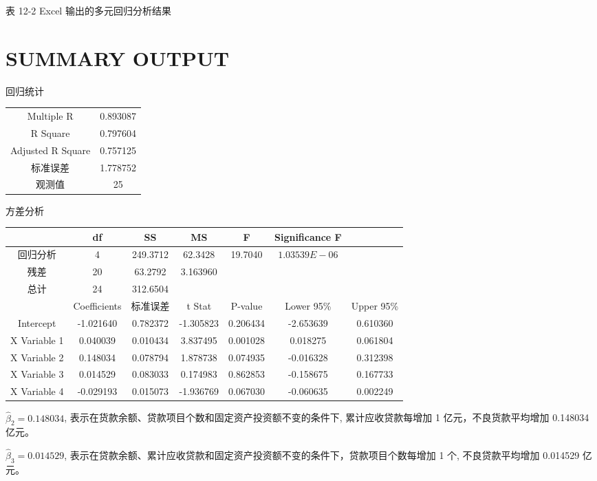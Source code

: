 \documentclass[10pt]{article}
\begin{document}
\begin{CJK*}{UTF8}{bsmi}
表 12-2 Excel 输出的多元回归分析结果

\section*{SUMMARY OUTPUT}
回归统计

\begin{center}
\begin{tabular}{cc}
\hline
Multiple R & 0.893087 \\
R Square & 0.797604 \\
Adjusted R Square & 0.757125 \\
标准误差 & 1.778752 \\
观测值 & 25 \\
\hline
\end{tabular}
\end{center}

方差分析

\begin{center}
\begin{tabular}{ccccccc}
\hline
 & df & SS & MS & F & Significance F &  \\
\hline
回归分析 & 4 & 249.3712 & 62.3428 & 19.7040 & $1.03539 E-06$ &  \\
残差 & 20 & 63.2792 & 3.163960 &  &  &  \\
总计 & 24 & 312.6504 &  &  &  &  \\
\hline
 & Coefficients & 标准误差 & t Stat & P-value & Lower 95\% & Upper 95\% \\
\hline
Intercept & -1.021640 & 0.782372 & -1.305823 & 0.206434 & -2.653639 & 0.610360 \\
X Variable 1 & 0.040039 & 0.010434 & 3.837495 & 0.001028 & 0.018275 & 0.061804 \\
X Variable 2 & 0.148034 & 0.078794 & 1.878738 & 0.074935 & -0.016328 & 0.312398 \\
X Variable 3 & 0.014529 & 0.083033 & 0.174983 & 0.862853 & -0.158675 & 0.167733 \\
X Variable 4 & -0.029193 & 0.015073 & -1.936769 & 0.067030 & -0.060635 & 0.002249 \\
\hline
\end{tabular}
\end{center}

$\hat{\beta}_{2}=0.148034$, 表示在货款余额、贷款项目个数和固定资产投资额不变的条件下, 累计应收贷款每增加 1 亿元，不良货款平均增加 0.148034 亿元。

$\hat{\beta}_{3}=0.014529$, 表示在贷款余额、累计应收贷款和固定资产投资额不变的条件下，贷款项目个数每增加 1 个, 不良贷款平均增加 0.014529 亿元。


\end{CJK*}
\end{document}

